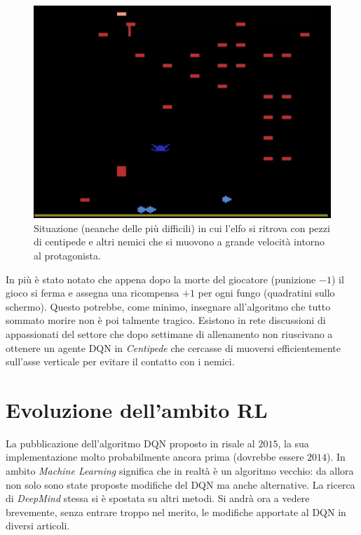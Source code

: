 \documentclass[twoside,twocolumn,10pt]{extarticle}
\theoremstyle{definition}
\begin{document}
		\begin{figure}[t]
			\centering
			\includegraphics[scale=.5]{images/centipede1.png}
			\caption{Situazione (neanche delle più difficili) in cui l'elfo si ritrova con pezzi di centipede e altri nemici che si muovono a grande velocità intorno al protagonista.}
			\label{fig:centipede}
		\end{figure}
		In più è stato notato che appena dopo la morte del giocatore (punizione $-1$) il gioco si ferma e assegna una ricompensa $+1$ per ogni fungo (quadratini sullo schermo). Questo potrebbe, come minimo, insegnare all'algoritmo che tutto sommato morire non è poi talmente tragico. Esistono in rete discussioni di appassionati del settore che dopo settimane di allenamento non riuscivano a ottenere un agente DQN in \textit{Centipede} che cercasse di muoversi efficientemente sull'asse verticale per evitare il contatto con i nemici.

\section{Evoluzione dell'ambito RL}\label{sec:evoalg}
	La pubblicazione dell'algoritmo DQN proposto in \cite{bib:dqn} risale al $2015$, la sua implementazione molto probabilmente ancora prima (dovrebbe essere $2014$). In ambito \textit{Machine Learning} significa che in realtà è un algoritmo vecchio: da allora non solo sono state proposte modifiche del DQN ma anche alternative. La ricerca di \textit{DeepMind} stessa si è spostata su altri metodi.	Si andrà ora a vedere brevemente, senza entrare troppo nel merito, le modifiche apportate al DQN in diversi articoli.
	
\end{document}
